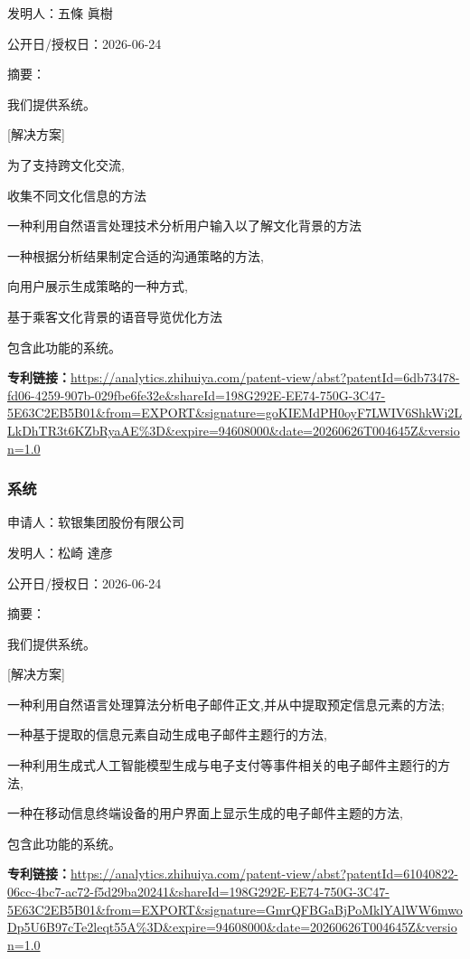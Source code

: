 \documentclass[12pt,a4paper]{ctexart}
\begin{document}
发明人：五條 眞樹

公开日/授权日：2026-06-24

摘要：

我们提供系统。 

 [解决方案] 

为了支持跨文化交流, 

收集不同文化信息的方法

一种利用自然语言处理技术分析用户输入以了解文化背景的方法

一种根据分析结果制定合适的沟通策略的方法, 

向用户展示生成策略的一种方式, 

基于乘客文化背景的语音导览优化方法

包含此功能的系统。

\noindent\textbf{专利链接：}\url{https://analytics.zhihuiya.com/patent-view/abst?patentId=6db73478-fd06-4259-907b-029fbe6fe32e&shareId=198G292E-EE74-750G-3C47-5E63C2EB5B01&from=EXPORT&signature=goKIEMdPH0oyF7LWIV6ShkWi2LLkDhTR3t6KZbRyaAE%3D&expire=94608000&date=20260626T004645Z&version=1.0}

\subsubsection{ 系统 }

申请人：软银集团股份有限公司

发明人：松崎 達彦

公开日/授权日：2026-06-24

摘要：

我们提供系统。 

 [解决方案] 

一种利用自然语言处理算法分析电子邮件正文,并从中提取预定信息元素的方法; 

一种基于提取的信息元素自动生成电子邮件主题行的方法, 

一种利用生成式人工智能模型生成与电子支付等事件相关的电子邮件主题行的方法, 

一种在移动信息终端设备的用户界面上显示生成的电子邮件主题的方法, 

包含此功能的系统。

\noindent\textbf{专利链接：}\url{https://analytics.zhihuiya.com/patent-view/abst?patentId=61040822-06cc-4bc7-ac72-f5d29ba20241&shareId=198G292E-EE74-750G-3C47-5E63C2EB5B01&from=EXPORT&signature=GmrQFBGaBjPoMklYAlWW6mwoDp5U6B97cTe2leqt55A%3D&expire=94608000&date=20260626T004645Z&version=1.0}




\newpage
\end{document}
